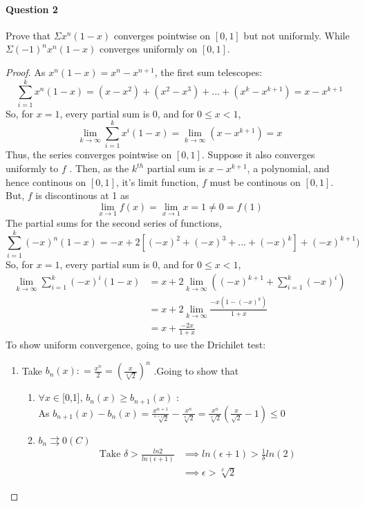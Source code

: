 \documentclass[20pt,a4paper]{extarticle} %
\begin{document}
\paragraph{Question 2}
Prove that $\Sigma x^n(1-x)$ converges pointwise on $[0,1]$ but not uniformly.
While $\Sigma (-1)^nx^n(1-x) $ converges uniformly on $[0,1]$.
\begin{proof}
	As $x^n(1-x) = x^n - x^{n+1}$, the first sum telescopes:
	\[\sum_{i=1}^k x^n(1-x) = (x - x^2) + (x^2 -x^3) +... + (x^k -x^{k+1}) = x- x^{k+1} \]
	So, for $x=1$, every partial sum is 0, and for $0\leq x <1$,
	\[ \lim_{k \to \infty } \sum_{i=1}^k x^i(1-x) = \lim_{k \to \infty }(x - x^{k+1})=x\]
	Thus, the series converges pointwise on $[0,1]$. Suppose it also converges uniformly to $f$ .
	Then, as the $k^{th}$ partial sum is $x-x^{k+1}$, a polynomial, and hence continous on $[0,1]$,
	it's limit function, $f$ must be continous on $[0,1]$. But, $f$ is discontinous at 1 as
	\[ \lim_{x \to 1} f(x) = \lim_{x \to 1} x = 1 \neq 0 = f(1) \]
	The partial sums for the second series of functions,
	\[\sum_{i=1}^k (-x)^n(1-x) = -x +2[(-x)^2 + (-x)^3 + ... + (-x)^k] + (-x)^{k+1})\]
	So, for $x=1$, every partial sum is 0, and for $0\leq x <1$,
	\begin{align*}
		\lim_{k \to \infty } \sum_{i=1}^k (-x)^i(1-x) &= x + 2\lim_{k \to \infty }((-x)^{k+1}+\sum_{i=1}^k (-x)^i ) \\
							      &=x + 2 \lim_{k \to \infty }\frac{-x(1-(-x)^k)}{1+x}\\
							      &=x+\frac{-2x}{1+x}
	\end{align*}
	To show uniform convergence, going to use the Drichilet test:
	\begin{enumerate}[label=\Roman*]
		\item Take $b_n(x): = \frac{x^n}{2} = (\frac{x}{\sqrt[n]{2}})^n$ .Going to show that
			\begin{enumerate}[label=(\roman*)]
				\item $\forall x \in$[0,1], $b_n(x) \geq b_{n+1}(x)$ : \\
					As $b_{n+1}(x) - b_{n}(x) = \frac{x^{n+1}}{\sqrt[n+1]{2}} -
					\frac{x^n}{\sqrt[n]{2}}= \frac{x^n}{\sqrt[n]{2}}(\frac{x}{\sqrt{2}}-1) \leq 0  $
				\item $b_n \rightrightarrows 0(C)$ \\
					\begin{align*}
						\text{ Take } \delta > \frac{ln2}{ln(\epsilon +1)} &\implies ln(\epsilon+1) >
					\frac{1}{\delta}ln(2) \\
					& \implies \epsilon> \sqrt[\delta]{2}

\end{align*}
\end{enumerate}
\end{enumerate}
\end{proof}
\end{document}
